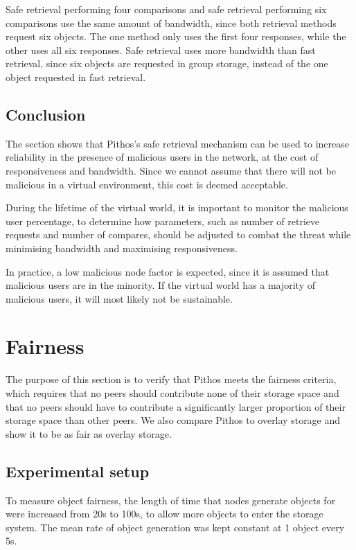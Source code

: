 Safe retrieval performing four comparisons and safe retrieval performing six comparisons use the same amount of bandwidth, since both retrieval methods request six objects. The one method only uses the first four responses, while the other uses all six responses. Safe retrieval uses more bandwidth than fast retrieval, since six objects are requested in group storage, instead of the one object requested in fast retrieval.

\subsection{Conclusion}

The section shows that Pithos's safe retrieval mechanism can be used to increase reliability in the presence of malicious users in the network, at the cost of responsiveness and bandwidth. Since we cannot assume that there will not be malicious in a virtual environment, this cost is deemed acceptable.

During the lifetime of the virtual world, it is important to monitor the malicious user percentage, to determine how parameters, such as number of retrieve requests and number of compares, should be adjusted to combat the threat while minimising bandwidth and maximising responsiveness.

In practice, a low malicious node factor is expected, since it is assumed that malicious users are in the minority. If the virtual world has a majority of malicious users, it will most likely not be sustainable.

\section{Fairness}

The purpose of this section is to verify that Pithos meets the fairness criteria, which requires that no peers should contribute none of their storage space and that no peers should have to contribute a significantly larger proportion of their storage space than other peers. We also compare Pithos to overlay storage and show it to be as fair as overlay storage.

\subsection{Experimental setup}

To measure object fairness, the length of time that nodes generate objects for were increased from 20s to 100s, to allow more objects to enter the storage system. The mean rate of object generation was kept constant at 1 object every 5s.

